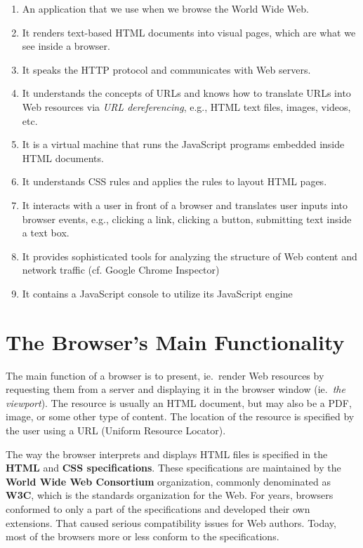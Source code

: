 \documentclass[a4paper, justified, notoc]{tufte-handout} %
\begin{document}
\begin{enumerate}
	\item An application that we use when we browse the World Wide Web.
	\item It renders text-based HTML documents into visual pages, which are what we see inside a browser.
	\item It speaks the HTTP protocol and communicates with Web servers.
	\item It understands the concepts of URLs and knows how to translate URLs into Web resources via \emph{URL dereferencing}, e.g., HTML text files, images, videos, etc.
	\item It is a virtual machine that runs the JavaScript programs embedded inside HTML documents.
	\item It understands CSS rules and applies the rules to layout HTML pages.
	\item It interacts with a user in front of a browser and translates user inputs into browser events, e.g., clicking a link, clicking a button, submitting text inside a text box.
	\item It provides sophisticated tools for analyzing the structure of Web content and network traffic (cf. Google Chrome Inspector)
	\item It contains a JavaScript console to utilize its JavaScript engine 
\end{enumerate}





\section{The Browser's Main Functionality} %
\label{sec:the_browser_s_main_functionality}
The main function of a browser is to present, ie.\ render Web resources by requesting them from a server and displaying it in the browser window (ie.~\emph{the viewport}). The resource is usually an HTML document, but may also be a PDF, image, or some other type of content. The location of the resource is specified by the user using a URL (Uniform Resource Locator).

The way the browser interprets and displays HTML files is specified in the \textbf{HTML} and \textbf{CSS specifications}. These specifications are maintained by the \textbf{World Wide Web Consortium} organization, commonly denominated as \textbf{W3C}, which is the standards organization for the Web. For years, browsers conformed to only a part of the specifications and developed their own extensions. That caused serious compatibility issues for Web authors. Today, most of the browsers more or less conform to the specifications.
\end{document}
